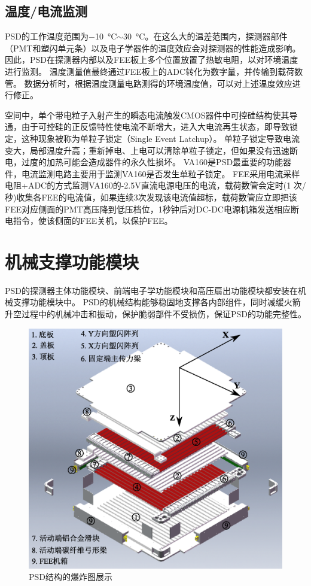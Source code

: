 \subsection{温度/电流监测}
PSD的工作温度范围为\SI{-10}{\celsius}$\sim$\SI{30}{\celsius}。在这么大的温差范围内，探测器部件（PMT和塑闪单元条）以及电子学器件的温度效应会对探测器的性能造成影响。
因此，PSD在探测器内部以及FEE板上多个位置放置了热敏电阻，以对环境温度进行监测。
温度测量值最终通过FEE板上的ADC转化为数字量，并传输到载荷数管。
数据分析时，根据温度测量电路测得的环境温度值，可以对上述温度效应进行修正。

空间中，单个带电粒子入射产生的瞬态电流触发CMOS器件中可控硅结构使其导通，由于可控硅的正反馈特性使电流不断增大，进入大电流再生状态，即导致锁定，这种现象被称为单粒子锁定（Single Event Latchup）。
单粒子锁定导致电流变大，局部温度升高；重新掉电、上电可以清除单粒子锁定，但如果没有迅速断电，过度的加热可能会造成器件的永久性损坏。
VA160是PSD最重要的功能器件，电流监测电路主要用于监测VA160是否发生单粒子锁定。
FEE采用电流采样电阻+ADC的方式监测VA160的-2.5V直流电源电压的电流，载荷数管会定时(1 次/秒)收集各FEE的电流值，如果连续3次发现该电流值超标，载荷数管应立即把该FEE对应侧面的PMT高压降到低压档位，1秒钟后对DC-DC电源机箱发送相应断电指令，使该侧面的FEE关机，以保护FEE。


\section{机械支撑功能模块}
\label{sec:description:psd_support}
PSD的探测器主体功能模块、前端电子学功能模块和高压扇出功能模块都安装在机械支撑功能模块中。
PSD的机械结构能够稳固地支撑各内部组件，同时减缓火箭升空过程中的机械冲击和振动，保护脆弱部件不受损伤，保证PSD的功能完整性。

\begin{figure}[h!]
	\centering
	\includegraphics[width=0.8\linewidth]{chap/description/fig/psd_explosion.eps}
	\caption{PSD结构的爆炸图展示}
	\label{fig:description:psd_structure}
\end{figure}

